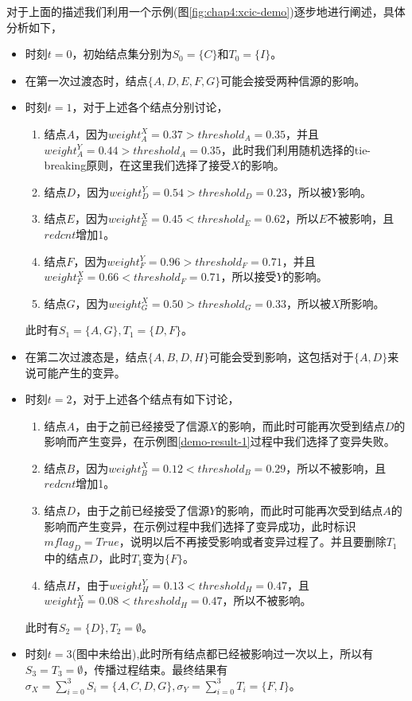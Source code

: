 对于上面的描述我们利用一个示例(图\ref{fig:chap4:xcic-demo})逐步地进行阐述，具体分析如下，
\begin{itemize}
\item 时刻$t=0$，初始结点集分别为$S_{0}=\{C\}$和$T_{0}=\{I\}$。
\item 在第一次过渡态时，结点$\{A, D, E, F, G\}$可能会接受两种信源的影响。
\item 时刻$t=1$，对于上述各个结点分别讨论，
	\begin{enumerate}
	\item 结点$A$，因为$weight_{A}^{X} = 0.37 > threshold_{A}=0.35$，并且$weight_{A}^{Y} = 0.44 > threshold_{A}=0.35$，此时我们利用随机选择的tie-breaking原则，在这里我们选择了接受$X$的影响。
	\item 结点$D$，因为$weight_{D}^{Y} = 0.54 > threshold_{D}=0.23$，所以被$Y$影响。
	\item 结点$E$，因为$weight_{E}^{X} = 0.45 < threshold_{E}=0.62$，所以$E$不被影响，且$redcnt$增加1。
	\item 结点$F$，因为$weight_{F}^{Y} = 0.96 > threshold_{F}=0.71$，并且$weight_{F}^{X} = 0.66 < threshold_{F}=0.71$，所以接受$Y$的影响。
	\item 结点$G$，因为$weight_{G}^{X} = 0.50 > threshold_{G}=0.33$，所以被$X$所影响。
	\end{enumerate}
	此时有$S_{1}=\{A, G\}, T_{1}=\{D, F\}$。
\item 在第二次过渡态是，结点$\{A, B, D, H\}$可能会受到影响，这包括对于$\{A, D\}$来说可能产生的变异。
\item 时刻$t=2$，对于上述各个结点有如下讨论，
	\begin{enumerate}
	\item 结点$A$，由于之前已经接受了信源$X$的影响，而此时可能再次受到结点$D$的影响而产生变异，在示例图\ref{demo-result-1}过程中我们选择了变异失败。
	\item 结点$B$，因为$weight_{B}^{X}=0.12 < threshold_{B}=0.29$，所以不被影响，且$redcnt$增加1。
	\item 结点$D$，由于之前已经接受了信源$Y$的影响，而此时可能再次受到结点$A$的影响而产生变异，在示例过程中我们选择了变异成功，此时标识$mflag_{D}=True$，说明以后不再接受影响或者变异过程了。并且要删除$T_{1}$中的结点$D$，此时$T_{1}$变为$\{F\}$。
	\item 结点$H$，由于$weight_{H}^{Y}=0.13 < threshold_{H}=0.47$，且$weight_{H}^{X}=0.08 < threshold_{H}=0.47$，所以不被影响。
	\end{enumerate}
	此时有$S_{2}=\{D\},T_{2}=\emptyset$。
\item 时刻$t=3$(图中未给出),此时所有结点都已经被影响过一次以上，所以有$S_{3}=T_{3}=\emptyset$，传播过程结束。最终结果有$\sigma_{X}=\sum_{i=0}^{3}S_{i}=\{A, C, D, G\}, \sigma_{Y}=\sum_{i=0}^{3}T_{i}=\{F, I\}$。
\end{itemize}


